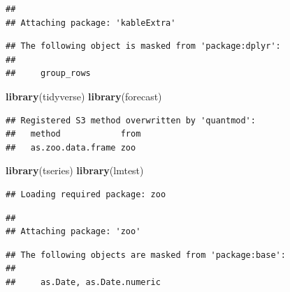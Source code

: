 \documentclass[
]{book}
\newenvironment{Shaded}{\begin{snugshade}}{\end{snugshade}}
\newcommand{\FunctionTok}[1]{\textcolor[rgb]{0.13,0.29,0.53}{\textbf{#1}}}
\newcommand{\NormalTok}[1]{#1}
\begin{document}
\begin{verbatim}
## 
## Attaching package: 'kableExtra'
\end{verbatim}

\begin{verbatim}
## The following object is masked from 'package:dplyr':
## 
##     group_rows
\end{verbatim}

\begin{Shaded}
\begin{Highlighting}[]
\FunctionTok{library}\NormalTok{(tidyverse)}
\FunctionTok{library}\NormalTok{(forecast)}
\end{Highlighting}
\end{Shaded}

\begin{verbatim}
## Registered S3 method overwritten by 'quantmod':
##   method            from
##   as.zoo.data.frame zoo
\end{verbatim}

\begin{Shaded}
\begin{Highlighting}[]
\FunctionTok{library}\NormalTok{(tseries)}
\FunctionTok{library}\NormalTok{(lmtest)}
\end{Highlighting}
\end{Shaded}

\begin{verbatim}
## Loading required package: zoo
\end{verbatim}

\begin{verbatim}
## 
## Attaching package: 'zoo'
\end{verbatim}

\begin{verbatim}
## The following objects are masked from 'package:base':
## 
##     as.Date, as.Date.numeric
\end{verbatim}
\end{document}
